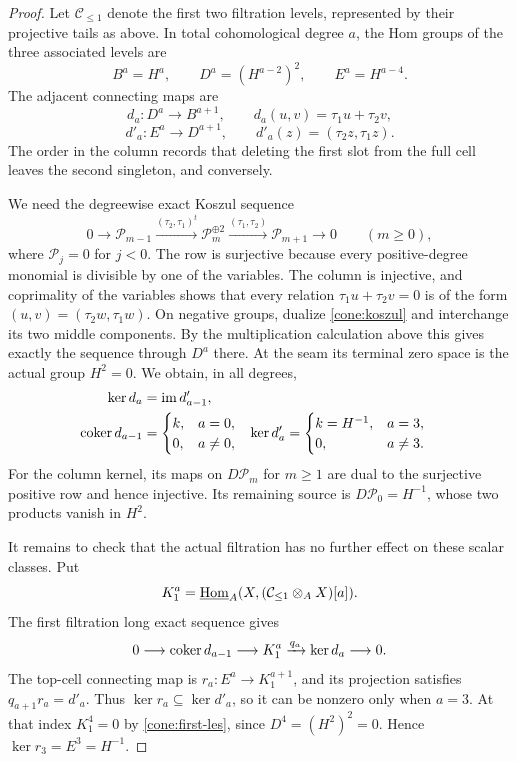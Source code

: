 \begin{proof}
Let $\mathcal C_{\leq1}$ denote the first two filtration levels, represented
by their projective tails as above. In total cohomological degree $a$,
the Hom groups of the three associated levels are
\[
 B^a=H^a,\qquad D^a=(H^{a-2})^2,\qquad E^a=H^{a-4}.
\]
The adjacent connecting maps are
\[
 d_a:D^a\longrightarrow B^{a+1},\qquad
 d_a(u,v)=\tau_1u+\tau_2v,
\]
\[
 d'_a:E^a\longrightarrow D^{a+1},\qquad
 d'_a(z)=(\tau_2z,\tau_1z).
\]
The order in the column records that deleting the first slot from the
full cell leaves the second singleton, and conversely.

We need the degreewise exact Koszul sequence
\begin{equation}
 0\longrightarrow \mathcal P_{m-1}
 \xrightarrow{(\tau_2,\tau_1)^t}\mathcal P_m^{\oplus2}
 \xrightarrow{(\tau_1,\tau_2)}\mathcal P_{m+1}
 \longrightarrow0\qquad(m\geq0),
 \label{cone:koszul}
\end{equation}
where $\mathcal P_j=0$ for $j<0$.
The row is surjective because every positive-degree monomial is divisible
by one of the variables. The column is injective, and coprimality of the
variables shows that every relation $\tau_1u+\tau_2v=0$ is of the form
$(u,v)=(\tau_2w,\tau_1w)$.
On negative groups, dualize \eqref{cone:koszul} and interchange its two
middle components. By the multiplication calculation above this gives
exactly the sequence through $D^a$ there. At the seam its terminal zero
space is the actual group $H^2=0$. We obtain, in all degrees,
\begin{align}
 \ker d_a&=\operatorname{im} d'_{a-1},\nonumber\\
 \operatorname{coker} d_{a-1}&=
 \begin{cases}k,&a=0,\\0,&a\ne0,\end{cases}
 &\ker d'_a&=
 \begin{cases}k=H^{-1},&a=3,\\0,&a\ne3.
 \end{cases}
 \label{cone:koszul-consequences}
\end{align}
For the column kernel, its maps on $D\mathcal P_m$ for $m\geq1$ are dual to the
surjective positive row and hence injective. Its remaining source is
$D\mathcal P_0=H^{-1}$, whose two products vanish in $H^2$.

It remains to check that the actual filtration has no further effect on
these scalar classes. Put
\[
 K_1^a=\underline{\operatorname{Hom}}_{A}(X,(\mathcal C_{\leq1}\otimes_A X)[a]).
\]
The first filtration long exact sequence gives
\begin{equation}
 0\longrightarrow\operatorname{coker} d_{a-1}\longrightarrow K_1^a
 \xrightarrow{q_a}\ker d_a\longrightarrow0.
 \label{cone:first-les}
\end{equation}
The top-cell connecting map is $r_a:E^a\to K_1^{a+1}$, and its projection
satisfies $q_{a+1}r_a=d'_a$. Thus $\ker r_a\subseteq\ker d'_a$, so it can
be nonzero only when $a=3$. At that index $K_1^4=0$ by
\eqref{cone:first-les}, since $D^4=(H^2)^2=0$. Hence
$\ker r_3=E^3=H^{-1}$.


\end{proof}

